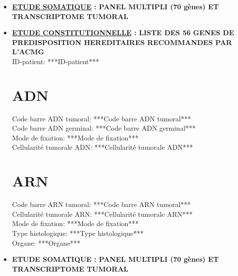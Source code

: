 \documentclass[10pt]{article}
\begin{document}
\begin{itemize}[font=\Large, label=, leftmargin=*, wide = 0pt]
\item \textbf{\underline{ETUDE SOMATIQUE} : PANEL MULTIPLI (70 gènes) ET TRANSCRIPTOME TUMORAL}\\
\item \textbf{\underline{ETUDE CONSTITUTIONNELLE} : LISTE DES 56 GENES DE PREDISPOSITION HEREDITAIRES RECOMMANDES PAR L’ACMG}\\

ID-patient: ***ID-patient***\\


\section*{ADN} 

Code barre ADN tumoral: ***Code barre ADN tumoral*** \\

Code barre ADN germinal: ***Code barre ADN germinal*** \\

Mode de fixation: ***Mode de fixation***\\

Cellularité tumorale ADN: ***Cellularité tumorale ADN***\\

\section*{ARN}

Code barre ARN tumoral: ***Code barre ARN tumoral*** \\

Cellularité tumorale ARN: ***Cellularité tumorale ARN***\\

Mode de fixation: ***Mode de fixation***\\


Type histologique: ***Type histologique***\\
\newline
Organe: ***Organe***

\newpage

\item \textbf{ETUDE SOMATIQUE : PANEL MULTIPLI (70 gènes) ET TRANSCRIPTOME TUMORAL}

\begin{enumerate}[leftmargin=*, label=\Roman*/, wide = 0pt]


\end{enumerate}
\end{itemize}
\end{document}
